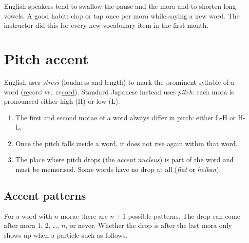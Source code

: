 \begin{aside}
English speakers tend to swallow the  pause and the  mora and to shorten
long vowels. A good habit: clap or tap once per mora while saying a new word. The
instructor did this for every new vocabulary item in the first month.
\end{aside}

\section{Pitch accent}

English uses \emph{stress} (loudness and length) to mark the prominent syllable of a word
(\underline{re}cord vs.\ re\underline{cord}). Standard Japanese instead uses \emph{pitch}:
each mora is pronounced either high (H) or low (L).

\begin{important}
\begin{enumerate}
  \item The first and second morae of a word always differ in pitch: either L-H or H-L.
  \item Once the pitch falls inside a word, it does not rise again within that word.
  \item The place where pitch drops (the \emph{accent nucleus}) is part of the word and
        must be memorised. Some words have no drop at all (\emph{flat} or \emph{heiban}).
\end{enumerate}
\end{important}

\subsection{Accent patterns}

For a word with $n$ morae there are $n+1$ possible patterns. The drop can come after
mora 1, 2, \ldots, $n$, or never. Whether the drop is after the last mora only shows up
when a particle such as  follows.

